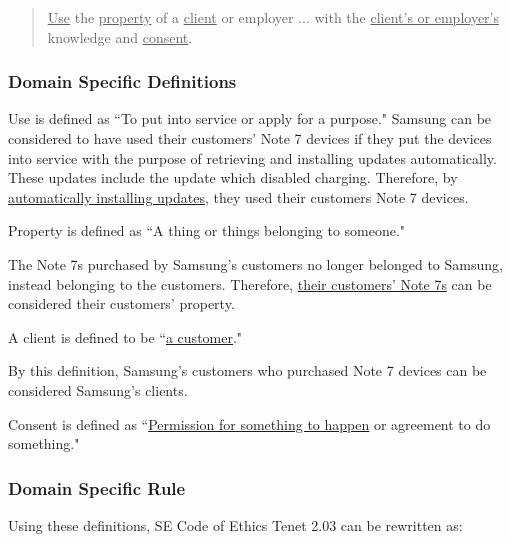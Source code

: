 \documentclass[12pt]{article}
\newcounter{subsubsubsection}[subsubsection]
\begin{document}
\begin{quote}
\uline{Use} the \uline{property} of a \uline{client} or employer ... with the \uline{client's or employer's} knowledge and \uline{consent}.\cite{codeOfEthics}
\end{quote}

\subsubsection{Domain Specific Definitions}

Use is defined as ``To put into service or apply for a purpose."\cite{wordnikDefineUse}
Samsung can be considered to have used their customers' Note 7 devices if they put the devices into service with the purpose of retrieving and installing updates automatically\cite{bgrCarriersRecallMessages}. These updates include the update which disabled charging. Therefore, by \uline{automatically installing updates}, they used their customers Note 7 devices.

Property is defined as ``A thing or things belonging to someone."\cite{oxfordDefineProperty} 

The Note 7s purchased by Samsung's customers no longer belonged to Samsung, instead belonging to the customers. Therefore, \uline{their customers' Note 7s} can be considered their customers' property.



\label{Define Client}
A client is defined to be ``\uline{a customer}."\cite{dictionaryDefineClient}

By this definition, Samsung's customers who purchased Note 7 devices can be considered Samsung's clients.

Consent is defined as ``\uline{Permission for something to happen} or agreement to do something."\cite{oxfordDefineConsent}

\subsubsection{Domain Specific Rule}
Using these definitions, SE Code of Ethics Tenet 2.03 can be rewritten as: 
\end{document}
